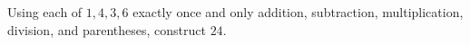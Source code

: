 Using each of $1,4,3,6$ exactly once and only addition, subtraction, multiplication, division, and parentheses, construct $24$.
